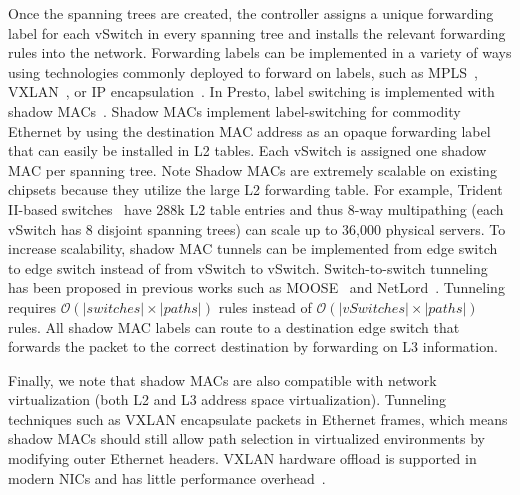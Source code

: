Once the spanning trees are created, the controller assigns a unique forwarding label
for each vSwitch in every spanning tree and installs the relevant forwarding rules into the network.
Forwarding labels can be implemented in a variety of ways using
technologies commonly deployed to forward on labels,
such as MPLS~\cite{casado2012fabric}, VXLAN~\cite{conga,nv-mtd}, or IP encapsulation~\cite{drb}. 
In Presto,
label switching is implemented with shadow MACs~\cite{shadow-mac}. 
Shadow MACs implement label-switching for commodity Ethernet by using the 
destination MAC address as an opaque forwarding label that can easily be 
installed in L2 tables. 
Each vSwitch is assigned one shadow MAC per spanning tree.
Note Shadow MACs are extremely scalable on
existing chipsets because they utilize the large L2 forwarding table. For example,
Trident II-based switches~\cite{trident2,smart-table,arista} have 288k L2 table entries and 
thus 8-way multipathing (\ie{}each vSwitch has 8 disjoint spanning trees)
can scale up to 36,000 physical servers. 
To increase scalability, shadow MAC tunnels can be implemented from 
edge switch to edge switch instead of from vSwitch to vSwitch. Switch-to-switch
tunneling has been proposed in previous works such as MOOSE~\cite{moose} and NetLord~\cite{netlord}. 
Tunneling requires $\mathcal{O}(|switches|\times|paths|)$ rules instead of
$\mathcal{O}(|vSwitches|\times|paths|)$ rules. All 
shadow MAC labels can route to a destination 
edge switch that forwards the packet to the correct destination by forwarding on 
L3 information.

Finally, we note that shadow MACs are also compatible with network virtualization 
(both L2 and L3 address space virtualization). 
Tunneling techniques such as VXLAN encapsulate packets in Ethernet frames, 
which means shadow MACs should still allow path selection 
in virtualized environments by modifying outer Ethernet headers.
VXLAN hardware offload is supported in modern NICs and has little
performance overhead~\cite{vxlan-bench}.

